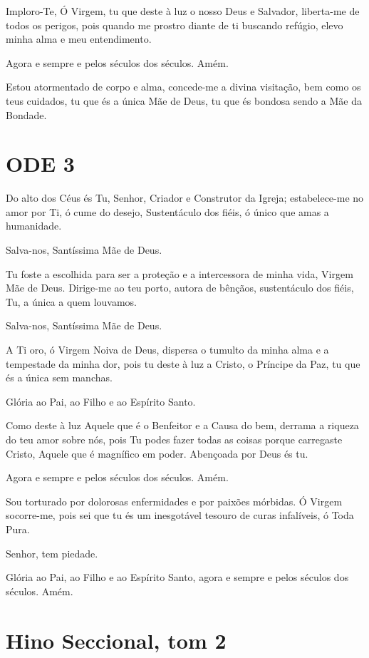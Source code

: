 \documentclass{subfiles}
\begin{document}
Imploro-Te, Ó Virgem, tu que deste à luz o nosso Deus e Salvador,
liberta-me de todos os perigos, pois quando me prostro diante de ti buscando
refúgio, elevo minha alma e meu entendimento.

Agora e sempre e pelos séculos dos séculos. Amém.

Estou atormentado de corpo e alma, concede-me a divina visitação,
bem como os teus cuidados, tu que és a única Mãe de Deus, tu que és bondosa
sendo a Mãe da Bondade.

\section*{ODE 3}

\eirmos{}Do alto dos Céus és Tu, Senhor, Criador e Construtor da Igreja;
estabelece-me no amor por Ti, ó cume do desejo, Sustentáculo dos fiéis, ó
único que amas a humanidade.

Salva-nos, Santíssima Mãe de Deus.

Tu foste a escolhida para ser a proteção e a intercessora de minha vida,
Virgem Mãe de Deus. Dirige-me ao teu porto, autora de bênçãos, sustentáculo
dos fiéis, Tu, a única a quem louvamos.

Salva-nos, Santíssima Mãe de Deus.

A Ti oro, ó Virgem Noiva de Deus, dispersa o tumulto da minha alma e
a tempestade da minha dor, pois tu deste à luz a Cristo, o Príncipe da Paz, tu
que és a única sem manchas.

Glória ao Pai, ao Filho e ao Espírito Santo.

Como deste à luz Aquele que é o Benfeitor e a Causa do bem, derrama
a riqueza do teu amor sobre nós, pois Tu podes fazer todas as coisas porque
carregaste Cristo, Aquele que é magnífico em poder. Abençoada por Deus és
tu.

Agora e sempre e pelos séculos dos séculos. Amém.

Sou torturado por dolorosas enfermidades e por paixões mórbidas. Ó
Virgem socorre-me, pois sei que tu és um inesgotável tesouro de curas
infalíveis, ó Toda Pura.

Senhor, tem piedade. 

Glória ao Pai, ao Filho e ao Espírito Santo, agora e sempre e pelos
séculos dos séculos. Amém.

\section*{Hino Seccional, tom 2}
\end{document}
